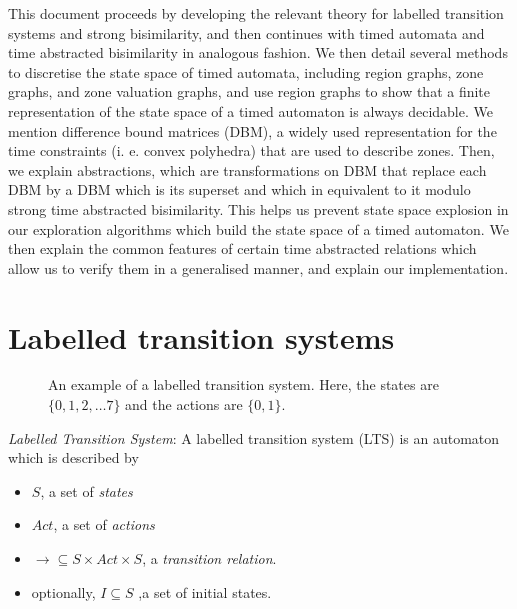 \documentclass[a4paper]{llncs}
\begin{document}
This document proceeds by developing the relevant theory for labelled transition
systems and strong bisimilarity, and then continues with timed
automata and time abstracted bisimilarity in analogous fashion. We 
then detail several methods to discretise the state space of timed
automata, including region graphs, zone graphs, and zone valuation
graphs, and use region graphs to show that a finite representation of
the state space of a timed automaton is always decidable. We mention
difference bound matrices (DBM), a widely used representation for the time
constraints (i. e. convex polyhedra) that are used to describe
zones. Then, we explain abstractions, which are transformations on DBM
that replace each DBM by a DBM which is its superset and
which in equivalent to it modulo strong time abstracted
bisimilarity. This helps us prevent state space explosion in our
exploration algorithms which build the state space of a timed
automaton. We then explain the common features of certain time
abstracted relations which allow us to verify them in a generalised
manner, and explain our implementation.


\section{Labelled transition systems}

\begin{SCfigure}
  \centering
  \def\svgwidth{0.3\columnwidth}
  
  \caption{An example of a labelled transition system. Here, the
    states are $\{0, 1, 2, \ldots 7\}$ and the actions are $\{0,
    1\}$.}
  \label{lts01}
\end{SCfigure}

\begin{definition}
  \emph{Labelled Transition System}: A labelled transition system (LTS)
  \cite{Keller:1976:FVP:360248.360251} is an automaton which is
  described by
  \begin{itemize}
  \item $S$, a set of \emph{states} 
  \item $Act$, a set of \emph{actions}
  \item $\rightarrow \subseteq S \times Act \times S$, a \emph{transition
    relation}.
  \item optionally, $I \subseteq S$ ,a set of initial states.
  \end{itemize}
\end{definition}
\end{document}
